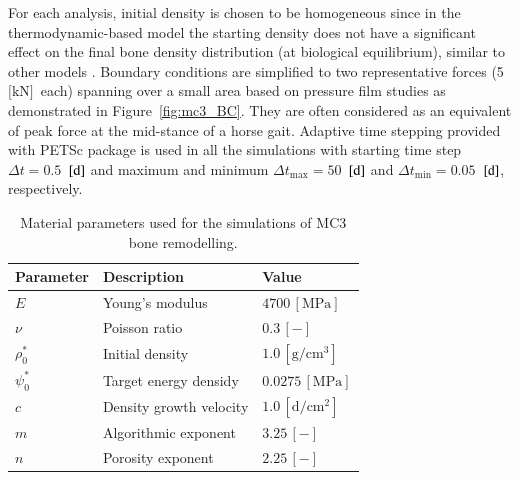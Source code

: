 \documentclass[11pt]{acmeArticle}
\numberwithin{equation}{section}
\begin{document}
For each analysis, initial density is chosen to be homogeneous since in the thermodynamic-based model the starting density does not have a significant effect on the final bone density distribution (at biological equilibrium), similar to other models \citep{kuhl2003theory}. %
Boundary conditions are simplified to two representative forces (5~$\text{[kN]}$~each) spanning over a small area based on pressure film studies \citep{Brama2001} as demonstrated in Figure~\ref{fig:mc3_BC}. 
They are often considered as an equivalent of peak force at the mid-stance of a horse gait. %
Adaptive time stepping provided with PETSc package \citep{petsc-web} is used in all the simulations with starting time step $\Delta t = 0.5$~$[\text d]$ and maximum and minimum $\Delta t_{\text {max}} = 50$~$[\text d]$ and $\Delta t_{\text {min}} = 0.05$~$[\text d]$, respectively.
\begin{table}[h]
	\centering
	\begin{tabular}{lll}
		\hline
		Parameter             & Description                  & Value  \\ \hline
		$E  $                 & Young's modulus              & $4700 \,\mathrm{ [MPa]}$  \citep{Les1994} \\
		$\nu  $               & Poisson ratio                & $0.3 \,\mathrm{ [-]}$ \\
		$\rho_0 ^\ast  $      & Initial density              & $1.0 \,\mathrm{[ g/cm^{3}]}$  \\
		$\psi_{0}^\ast $      & Target energy densidy        & $0.0275\,\mathrm{ [MPa]}$   \citep{Waffenschmidt2012}  \\
		$c$                   & Density growth velocity      & $1.0 \,\mathrm{ [d/cm^{2}]}$   \\
		$m$                   & Algorithmic exponent         & $ 3.25 \,\mathrm{ [-]}$          \\
		$n$                   & Porosity exponent            & $2.25 \,\mathrm{ [-]}$      \citep{Les1994}   \\ 
		\hline
	\end{tabular} 
	\caption{Material parameters used for the simulations of MC3 bone remodelling.}
	\label{tab:parameters_mc3}
\end{table}
\end{document}
